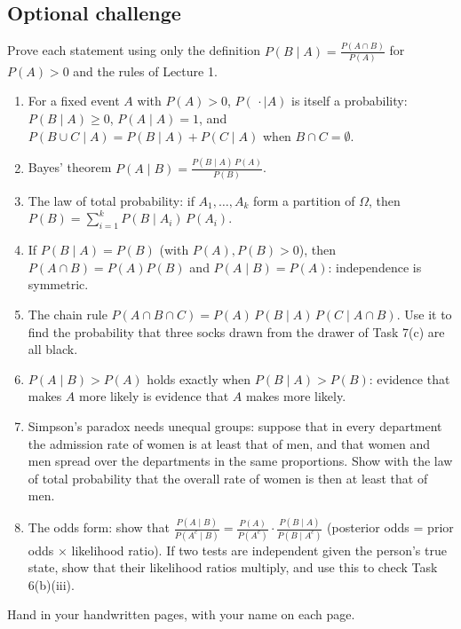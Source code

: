 \subsection*{Optional challenge}
Prove each statement using only the definition $P(B \mid A) = \frac{P(A \cap B)}{P(A)}$ for $P(A) > 0$ and the rules
of Lecture 1.
\begin{enumerate}[label=(\alph*)]
  \item For a fixed event $A$ with $P(A) > 0$, $P(\,\cdot \mid A)$ is itself a probability: $P(B \mid A) \ge 0$,
        $P(A \mid A) = 1$, and $P(B \cup C \mid A) = P(B \mid A) + P(C \mid A)$ when $B \cap C = \emptyset$.
  \item Bayes' theorem $P(A \mid B) = \frac{P(B \mid A)\,P(A)}{P(B)}$.
  \item The law of total probability: if $A_1, \dots, A_k$ form a partition of $\Omega$, then
        $P(B) = \sum_{i=1}^{k} P(B \mid A_i)\,P(A_i)$.
  \item If $P(B \mid A) = P(B)$ (with $P(A), P(B) > 0$), then $P(A \cap B) = P(A)P(B)$ and $P(A \mid B) = P(A)$:
        independence is symmetric.
  \item The chain rule $P(A \cap B \cap C) = P(A)\,P(B \mid A)\,P(C \mid A \cap B)$. Use it to find the probability
        that three socks drawn from the drawer of Task 7(c) are all black.
  \item $P(A \mid B) > P(A)$ holds exactly when $P(B \mid A) > P(B)$: evidence that makes $A$ more likely is evidence
        that $A$ makes more likely.
  \item Simpson's paradox needs unequal groups: suppose that in every department the admission rate of women is at
        least that of men, and that women and men spread over the departments in the same proportions. Show with the
        law of total probability that the overall rate of women is then at least that of men.
  \item The odds form: show that $\frac{P(A \mid B)}{P(A^c \mid B)} = \frac{P(A)}{P(A^c)} \cdot
        \frac{P(B \mid A)}{P(B \mid A^c)}$ (posterior odds = prior odds $\times$ likelihood ratio). If two tests are
        independent given the person's true state, show that their likelihood ratios multiply, and use this to check
        Task 6(b)(iii).
\end{enumerate}

\medskip
\noindent Hand in your handwritten pages, with your name on each page.
